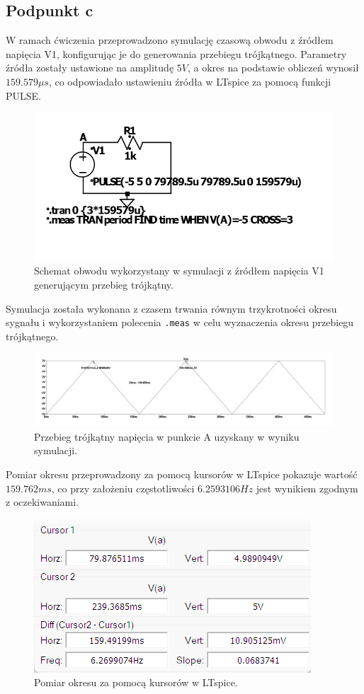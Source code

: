 \documentclass[10pt]{article}
\begin{document}
	\subsection*{Podpunkt c}
	W ramach ćwiczenia przeprowadzono symulację czasową obwodu z źródłem napięcia V1, konfigurując je do generowania przebiegu trójkątnego. Parametry źródła zostały ustawione na amplitudę \(5V\), a okres na podstawie obliczeń wynosił \(159.579\mu s\), co odpowiadało ustawieniu źródła w LTspice za pomocą funkcji PULSE.
	
	\begin{figure}[H]
		\centering
		\includegraphics[width=0.8\linewidth]{2cobwod.png}
		\caption{Schemat obwodu wykorzystany w symulacji z źródłem napięcia V1 generującym przebieg trójkątny.}
		\label{fig:2cobwod}
	\end{figure}
	
	Symulacja została wykonana z czasem trwania równym trzykrotności okresu sygnału i wykorzystaniem polecenia \texttt{.meas} w celu wyznaczenia okresu przebiegu trójkątnego.
	
	\begin{figure}[H]
		\centering
		\includegraphics[width=\linewidth]{2cwykres.png}
		\caption{Przebieg trójkątny napięcia w punkcie A uzyskany w wyniku symulacji.}
		\label{fig:2cwykres}
	\end{figure}
	
	Pomiar okresu przeprowadzony za pomocą kursorów w LTspice pokazuje wartość \(159.762ms\), co przy założeniu częstotliwości \(6.2593106Hz\) jest wynikiem zgodnym z oczekiwaniami.
	
	\begin{figure}[H]
		\centering
		\includegraphics[width=0.5\linewidth]{2cwynik.png}
		\caption{Pomiar okresu za pomocą kursorów w LTspice.}
		\label{fig:2cwynik}
	\end{figure}
	
\end{document}
